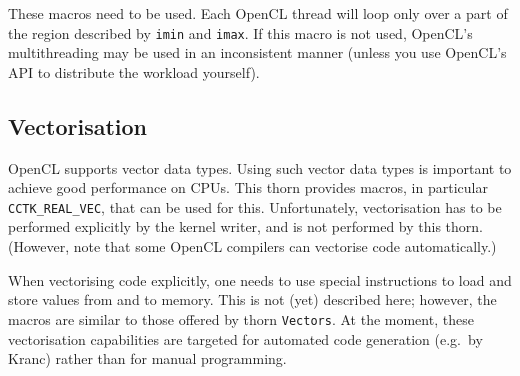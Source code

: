 These macros need to be used. Each OpenCL thread will loop only over a
part of the region described by \texttt{imin} and \texttt{imax}. If
this macro is not used, OpenCL's multithreading may be used in an
inconsistent manner (unless you use OpenCL's API to distribute the
workload yourself).

\subsection{Vectorisation}

OpenCL supports vector data types. Using such vector data types is
important to achieve good performance on CPUs. This thorn provides
macros, in particular \texttt{CCTK\_REAL\_VEC}, that can be used for
this. Unfortunately, vectorisation has to be performed explicitly by
the kernel writer, and is not performed by this thorn. (However, note
that some OpenCL compilers can vectorise code automatically.)

When vectorising code explicitly, one needs to use special
instructions to load and store values from and to memory. This is not
(yet) described here; however, the macros are similar to those offered
by thorn \texttt{Vectors}. At the moment, these vectorisation
capabilities are targeted for automated code generation (e.g.\ by
Kranc) rather than for manual programming.



% 



